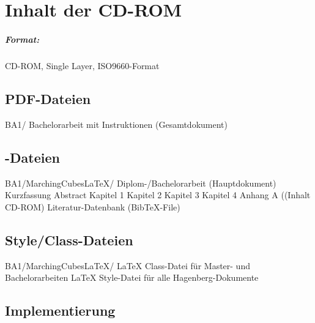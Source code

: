 \chapter{Inhalt der CD-ROM}
\label{app:cdrom}

\paragraph{Format:} 
CD-ROM, Single Layer, ISO9660-Format%

\section{PDF-Dateien}
\begin{FileList}{BA1/}
	 Bachelorarbeit mit Instruktionen (Gesamtdokument)%
\end{FileList}


\section{\latex-Dateien}

\begin{FileList}{BA1/MarchingCubesLaTeX/}
	 Diplom-/Bachelorarbeit (Hauptdokument) %
	 Kurzfassung %
	 Abstract %
	 Kapitel 1 %
	 Kapitel 2 %
	 Kapitel 3 %
	 Kapitel 4 %
	 Anhang A ((Inhalt CD-ROM) %
	 Literatur-Datenbank (BibTeX-File)
\end{FileList}

\section{Style/Class-Dateien}

\begin{FileList}{BA1/MarchingCubesLaTeX/}
	 LaTeX Class-Datei für Master- und Bachelorarbeiten
	 LaTeX Style-Datei für alle Hagenberg-Dokumente
\end{FileList}


\section{Implementierung}

